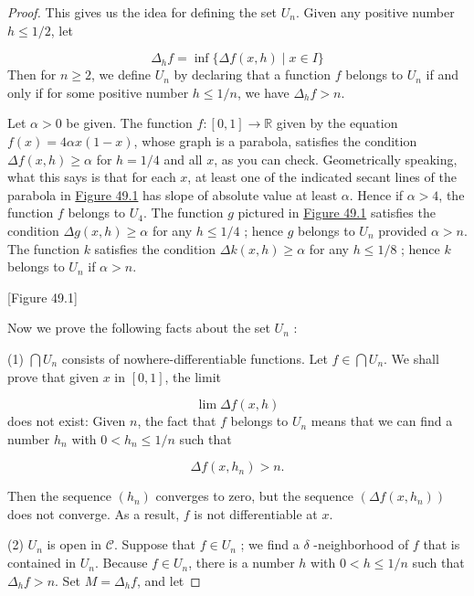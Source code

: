 \begin{proof}
This gives us the idea for defining the set \(U_{n}\). Given any positive number \(h \leq 1/2\), let

\[
{\Delta }_{h}f = \inf \{ {\Delta f}({x,h}) \mid x \in I\}
\]
Then for \(n \geq 2\), we define \(U_{n}\) by declaring that a function \(f\) belongs to \(U_{n}\) if and only if for some positive number \(h \leq 1/n\), we have \({\Delta }_{h}f > n\).

\begin{centeredblock}
\begin{example}
\label{ex:\thesection.\theexample}
Let \(\alpha > 0\) be given. The function \(f : [ {0,1}] \rightarrow \mathbb{R}\) given by the equation \(f(x) = {4\alpha x}({1 - x})\), whose graph is a parabola, satisfies the condition \({\Delta f}({x,h}) \geq \alpha\) for \(h = 1/4\) and all \(x\), as you can check. Geometrically speaking, what this says is that for each \(x\), at least one of the indicated secant lines of the parabola in \hyperref[fig:49.1]{Figure 49.1} has slope of absolute value at least \(\alpha\). Hence if \(\alpha > 4\), the function \(f\) belongs to \(U_{4}\). The function \(g\) pictured in \hyperref[fig:49.1]{Figure 49.1} satisfies the condition \({\Delta g}({x,h}) \geq \alpha\) for any \(h \leq 1/4\) ; hence \(g\) belongs to \(U_{n}\) provided \(\alpha > n\). The function \(k\) satisfies the condition \({\Delta k}({x,h}) \geq \alpha\) for any \(h \leq 1/8\) ; hence \(k\) belongs to \(U_{n}\) if \(\alpha > n\).

[Figure 49.1]
\end{example}
\end{centeredblock}

Now we prove the following facts about the set \(U_{n}\) :

(1) \(\bigcap {U}_{n}\) consists of nowhere-differentiable functions. Let \(f \in \bigcap {U}_{n}\). We shall prove that given \(x\) in \([ {0,1}]\), the limit

\[
\lim {\Delta f}({x,h})
\]
does not exist: Given \(n\), the fact that \(f\) belongs to \(U_{n}\) means that we can find a number \(h_{n}\) with \(0 < h_{n} \leq 1/n\) such that

\[
{\Delta f}({x,h_{n}}) > n\text{.}
\]

Then the sequence \((h_{n})\) converges to zero, but the sequence \(({{\Delta f}({x,h_{n}}) })\) does not converge. As a result, \(f\) is not differentiable at \(x\).

(2) \(U_{n}\) is open in \(\mathcal{C}\). Suppose that \(f \in {U}_{n}\) ; we find a \(\delta\) -neighborhood of \(f\) that is contained in \(U_{n}\). Because \(f \in {U}_{n}\), there is a number \(h\) with \(0 < h \leq 1/n\) such that \({\Delta }_{h}f > n\). Set \(M = {\Delta }_{h}f\), and let


\end{proof}
